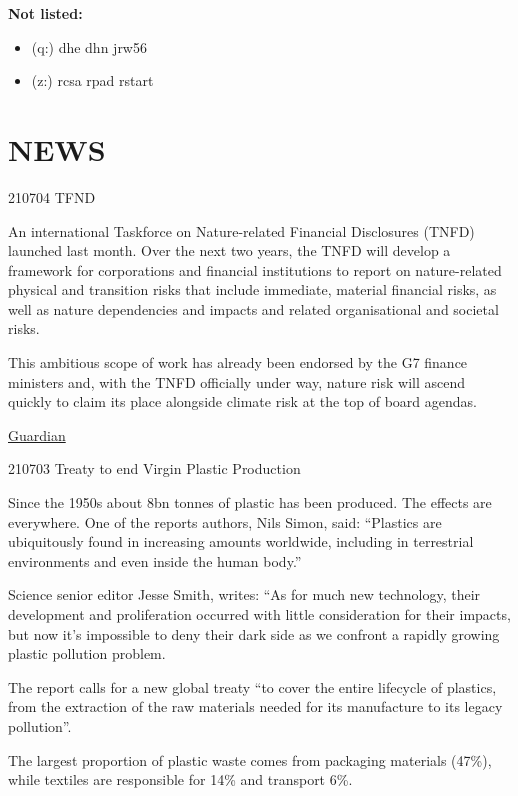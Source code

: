 \documentclass[
]{book}
\providecommand{\tightlist}{%
  \setlength{\itemsep}{0pt}\setlength{\parskip}{0pt}}
\begin{document}
\textbf{Not listed:}

\begin{itemize}
\tightlist
\item
  (q:) dhe dhn jrw56
\item
  (z:) rcsa rpad rstart
\end{itemize}

\hypertarget{news}{%
\chapter{NEWS}\label{news}}

210704 TFND

An international Taskforce on Nature-related Financial Disclosures (TNFD) launched last month. Over the next two years, the TNFD will develop a framework for corporations and financial institutions to report on nature-related physical and transition risks that include immediate, material financial risks, as well as nature dependencies and impacts and related organisational and societal risks.

This ambitious scope of work has already been endorsed by the G7 finance ministers and, with the TNFD officially under way, nature risk will ascend quickly to claim its place alongside climate risk at the top of board agendas.

\href{https://www.theguardian.com/commentisfree/2021/jul/04/biodiversity-loss-could-wreck-the-global-financial-system-and-its-only-a-matter-of-time}{Guardian}

210703 Treaty to end Virgin Plastic Production

Since the 1950s about 8bn tonnes of plastic has been produced. The effects are everywhere. One of the reports authors, Nils Simon, said: ``Plastics are ubiquitously found in increasing amounts worldwide, including in terrestrial environments and even inside the human body.''

Science senior editor Jesse Smith, writes: ``As for much new technology, their development and proliferation occurred with little consideration for their impacts, but now it's impossible to deny their dark side as we confront a rapidly growing plastic pollution problem.

The report calls for a new global treaty ``to cover the entire lifecycle of plastics, from the extraction of the raw materials needed for its manufacture to its legacy pollution''.

The largest proportion of plastic waste comes from packaging materials (47\%), while textiles are responsible for 14\% and transport 6\%.
\end{document}
